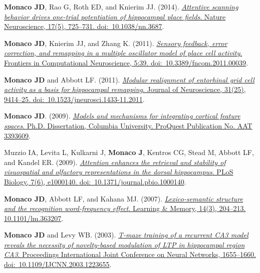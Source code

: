 \documentclass[10pt]{article}
\begin{document}
\begin{description}
\item \textbf{Monaco JD}, Rao G, Roth ED, and Knierim JJ. (2014). \href{http://dx.doi.org/10.1038/nn.3687}{\emph{Attentive scanning behavior drives one-trial potentiation of hippocampal place fields}. Nature Neuroscience, 17(5), 725--731. doi:~10.1038/nn.3687}.
\item \textbf{Monaco JD}, Knierim JJ, and Zhang K. (2011). \href{http://dx.doi.org/10.3389/fncom.2011.00039}{\emph{Sensory feedback, error correction, and remapping in a multiple oscillator model of place cell activity}. Frontiers in Computational Neuroscience, 5:39. doi:~10.3389/fncom.2011.00039}.
\item \textbf{Monaco JD} and Abbott LF. (2011). \href{http://dx.doi.org/10.1523/JNEUROSCI.1433-11.2011}{\emph{Modular realignment of entorhinal grid cell activity as a basis for hippocampal remapping}. Journal of Neuroscience, 31(25), 9414--25. doi:~10.1523/jneurosci.1433-11.2011}.
\item \textbf{Monaco JD}. (2009). \href{http://search.proquest.com/docview/304862872/abstract}{\emph{Models and mechanisms for integrating cortical feature spaces}. Ph.D. Dissertation, Columbia University. ProQuest Publication No. AAT 3393609}.
\item Muzzio IA, Levita L, Kulkarni J, \textbf{Monaco J}, Kentros CG, Stead M, Abbott LF, and Kandel ER. (2009). \href{http://dx.doi.org/10.1371/journal.pbio.1000140}{\emph{Attention enhances the retrieval and stability of visuospatial and olfactory representations in the dorsal hippocampus}. PLoS Biology, 7(6), e1000140. doi:~10.1371/journal.pbio.1000140}.
\item \textbf{Monaco JD}, Abbott LF, and Kahana MJ. (2007). \href{http://dx.doi.org/10.1101/lm.363207}{\emph{Lexico-semantic structure and the recognition word-frequency effect}. Learning \& Memory, 14(3), 204--213. 10.1101/lm.363207}.
\item \textbf{Monaco JD} and Levy WB. (2003). \href{http://dx.doi.org/10.1109/IJCNN.2003.1223655}{\emph{T-maze training of a recurrent CA3 model reveals the necessity of novelty-based modulation of LTP in hippocampal region CA3}. Proceedings International Joint Conference on Neural Networks, 1655--1660. doi:~10.1109/IJCNN.2003.1223655}.
\end{description}
\end{document}
